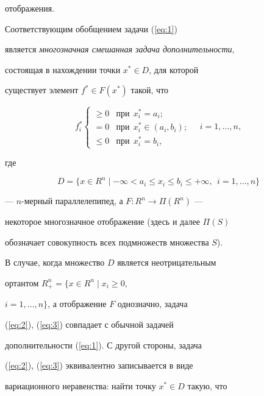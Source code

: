 отображения.


Соответствующим обобщением задачи (\ref{eq:1})


является {\it многозначная смешанная задача дополнительности},


состоящая в нахождении точки $x^* \in D$, для которой


существует элемент $f^* \in F(x^*)$ такой, что


\begin{equation}\label{eq:2}


f_{i}^{*}


\begin{cases}


\ge 0 & \text{при}\ \ x^*_i=a_i; \\


=0 & \text{при}\ \ x^*_i \in (a_i,b_i); \\


\le 0 & \text{при}\ \ x^*_i=b_i,


\end{cases} \quad i=1,\dotsc,n,


\end{equation}


где


\begin{equation}\label{eq:3}


D=\{x \in R^n \mid -\infty < a_i \le x_i \le b_i \le +\infty,


\ \ i=1,\dotsc,n\}


\end{equation}


--- $n$-мерный параллелепипед, а $F:R^{n}\to \Pi (R^{n})$ ---


некоторое многозначное отображение  (здесь и далее $\Pi(S)$


обозначает совокупность всех подмножеств множества $S$). 


В случае, когда множество $D$ является неотрицательным


ортантом $R^{n}_{+} = \{x\in R^{n}\mid x_i \ge 0$,


$i=1,\dotsc,n\}$, а отображение $F$ однозначно, задача


(\ref{eq:2}), (\ref{eq:3}) совпадает с обычной задачей


дополнительности (\ref{eq:1}). С другой стороны, задача


(\ref{eq:2}), (\ref{eq:3}) эквивалентно записывается в виде


вариационного неравенства: найти точку $x^* \in D$ такую, что


